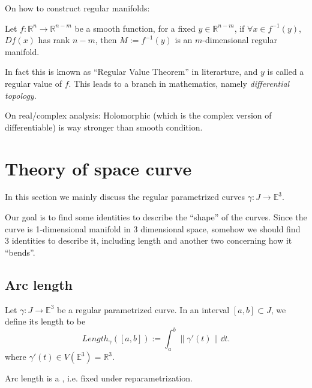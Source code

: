 \begin{remark}
    On how to construct regular manifolds:

	Let $f: \mathbb{R}^n\to \mathbb{R}^{n-m}$ be a smooth function,
	for a fixed $y\in \mathbb{R}^{n-m}$, if $\forall x\in f^{-1}(y)$,
	$Df(x)$ has rank $n-m$, then $M:=f^{-1}(y)$ is an $m$-dimensional
	regular manifold.

	In fact this is known as ``Regular Value Theorem'' in literarture,
	and $y$ is called a regular value of $f$. This leads to a branch in
	mathematics, namely \textit{differential topology}.
\end{remark}
\begin{remark}
    On real/complex analysis:
	Holomorphic (which is the complex version of differentiable) is way
	stronger than smooth condition.
\end{remark}

\section{Theory of space curve}
\label{sec:Theory of space curve}
In this section we mainly discuss the regular parametrized curves
$\gamma: J\to \mathbb{E}^3$.

Our goal is to find some identities to describe the ``shape'' of the curves.
Since the curve is 1-dimensional manifold in 3 dimensional space,
somehow we should find 3 identities to describe it, including length and
another two concerning how it ``bends''.

\subsection{Arc length}
\label{sub:arc length}
\begin{definition}
	Let $\gamma: J\to \mathbb{E}^3$ be a regular parametrized curve.
	In an interval $[a,b] \subset J$, we define its length to be
	\[
		Length_\gamma([a,b]) := \int_{a}^{b} \lVert \gamma'(t)\rVert \dd t.
	\]
	where $\gamma'(t)\in V(\mathbb{E}^3)=\mathbb{R}^3$.
\end{definition}
\begin{proposition}
	Arc length is a , i.e. fixed under reparametrization.
\end{proposition}

